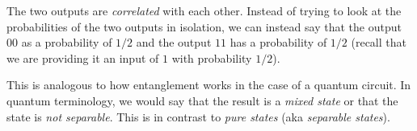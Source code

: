 \documentclass[runningheads]{llncs}
\begin{document}
The two outputs are \textit{correlated} with each other. Instead of trying to look at the probabilities of the two outputs in isolation, we can
instead say that the output $00$ as a probability of $1/2$ and the output $11$ has a probability of $1/2$ (recall that we are providing it an input of $1$ with probability $1/2$).

This is analogous to how entanglement works in the case of a quantum circuit. In quantum terminology, we would say that the result is a \textit{mixed state} or that the state is \textit{not separable}. This is in contrast to \textit{pure states} (aka \textit{separable states}).
\end{document}
